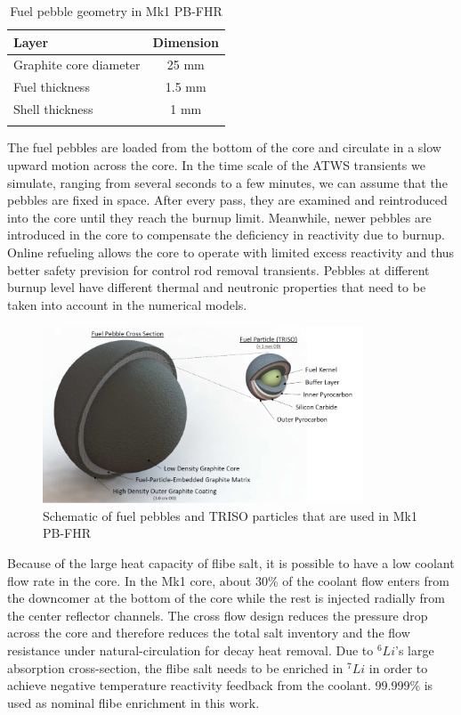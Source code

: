 \documentclass{elsarticle}
\begin{document}
\begin{table}[h]
    \centering
    \begin{tabular}{lc}
        Layer & Dimension\\
        \hline
        Graphite core diameter& 25 mm \\
        Fuel thickness & 1.5 mm\\
        Shell thickness & 1 mm\\
        \hline\\
    \end{tabular}
    \caption{Fuel pebble geometry in Mk1 PB-FHR \cite{Andreades2016}}
    \label{tab:Mk1_pb}
\end{table}


The fuel pebbles are loaded from the bottom of the core and circulate in a slow upward motion across the core. In the time scale of the ATWS transients we simulate, ranging from several seconds to a few minutes, we can assume that the pebbles are fixed in space. After every pass, they are examined and reintroduced into the core until they reach the burnup limit. Meanwhile, newer pebbles are introduced in the core to compensate the deficiency in reactivity due to burnup. Online refueling allows the core to operate with limited excess reactivity and thus better safety prevision for control rod removal transients. Pebbles at different burnup level have different thermal and neutronic properties that need to be taken into account in the numerical models.



\begin{figure}
  \centering
  \includegraphics[width=0.85\textwidth]{./images/design/Mk1_fuel.png}
  \caption{Schematic of fuel pebbles and TRISO particles that are used in Mk1 PB-FHR}
  \label{fig:pb_triso_Mk1}
\end{figure}


Because of the large heat capacity of flibe salt, it is possible to have a low coolant flow rate in the core.
In the Mk1 core, about 30\% of the coolant flow enters from the downcomer at the bottom of the core while the rest is injected radially from the center reflector channels. The cross flow design reduces the pressure drop across the core and therefore reduces the total salt inventory and the flow resistance under natural-circulation for decay heat removal. 
Due to $^6Li$'s large absorption cross-section, the flibe salt needs to be enriched in $^7Li$ in order to achieve negative temperature reactivity feedback from the coolant. 
99.999\% is used as nominal flibe enrichment in this work.
\end{document}
